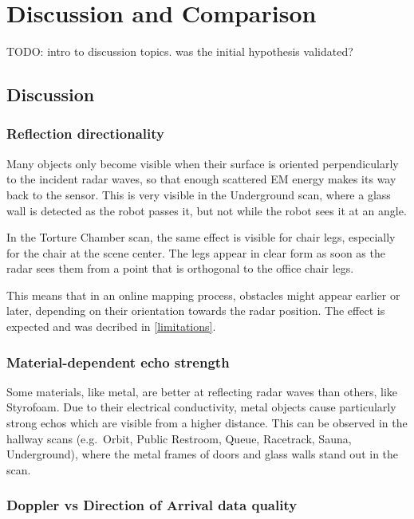 \chapter{Discussion and Comparison}\label{discussion-and-comparison}

TODO: intro to discussion topics. was the initial hypothesis validated?

\section{Discussion}

\subsection{Reflection directionality}\label{reflection-directionality}

Many objects only become visible when their surface is oriented
perpendicularly to the incident radar waves, so that enough scattered EM
energy makes its way back to the sensor. This is very visible in the
Underground scan, where a glass wall is detected as the robot passes it,
but not while the robot sees it at an angle.

In the Torture Chamber scan, the same effect is visible for chair legs,
especially for the chair at the scene center. The legs appear in clear
form as soon as the radar sees them from a point that is orthogonal
to the office chair legs.

This means that in an online mapping process, obstacles might appear earlier or later, depending on their orientation towards the radar position. The effect is expected and was decribed in \cref{limitations}.


\subsection{Material-dependent echo strength}\label{material-dependent-echo-strength}

Some materials, like metal, are better at reflecting radar
waves than others, like Styrofoam. Due to their electrical conductivity, metal objects cause particularly strong echos which are visible from a higher distance. This can be observed in the hallway scans (e.g.~Orbit, Public Restroom, Queue,
Racetrack, Sauna, Underground), where the metal frames of doors and
glass walls stand out in the scan.

\subsection{Doppler vs Direction of Arrival data quality}\label{doppler-vs-direction-of-arrival-data-quality}

